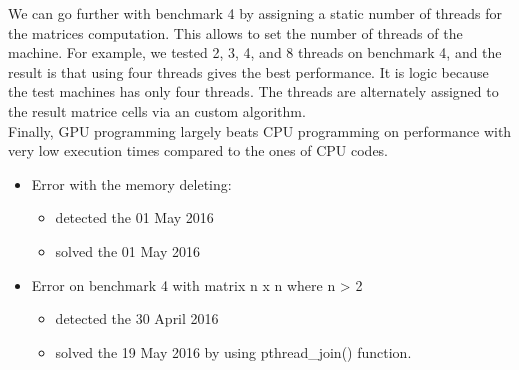 \documentclass[]{article}
\begin{document}
We can go further with benchmark 4 by assigning a static number of threads for the matrices computation.
This allows to set the number of threads of the machine. For example, we tested 2, 3, 4, and 8 threads on benchmark 4, and the
result is that using four threads gives the best performance. It is logic because the test machines has only four threads.
The threads are alternately assigned to the result matrice cells via an custom algorithm.
~\\


Finally, GPU programming largely beats CPU programming on performance with very low execution times compared to
the ones of CPU codes.




\begin{itemize}
\itemsep1pt\parskip0pt
\item
  Error with the memory deleting:

  \begin{itemize}
  \itemsep1pt\parskip0pt
  \item
    detected the 01 May 2016
  \item
    solved the 01 May 2016
  \end{itemize}
\item
  Error on benchmark 4 with matrix n x n where n \textgreater{} 2

  \begin{itemize}
  \itemsep1pt\parskip0pt
  \item
    detected the 30 April 2016
  \item
    solved the 19 May 2016 by using pthread\_join() function.
  \end{itemize}
\end{itemize}
\end{document}
